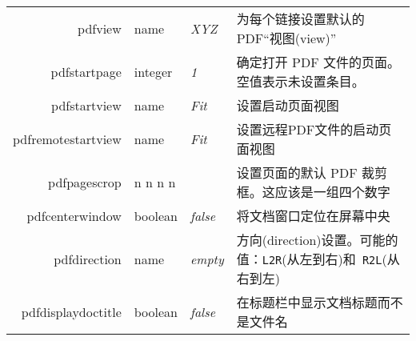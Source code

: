 \documentclass{article}
\begin{document}
\begin{longtable}{@{}>{\ttfamily}r>{\raggedright}p{}>{\itshape}lp{7cm}@{}}
    pdfview             & name           & XYZ                       & 为每个链接设置默认的 PDF“视图(view)”                                                                                                                                                                                                     \\
    pdfstartpage        & integer        & 1                         & 确定打开 PDF 文件的页面。空值表示未设置条目。                                                                                                                                                                                                    \\
    pdfstartview        & name           & Fit                       & 设置启动页面视图                                                                                                                                                                                                                     \\
    pdfremotestartview  & name           & Fit                       & 设置远程PDF文件的启动页面视图                                                                                                                                                                                                             \\
    pdfpagescrop        & n n n n        &                           & 设置页面的默认 PDF 裁剪框。这应该是一组四个数字                                                                                                                                                                                                   \\
    pdfcenterwindow     & boolean        & false                     & 将文档窗口定位在屏幕中央                                                                                                                                                                                                                 \\
    pdfdirection        & name           & empty                     & 方向(direction)设置。可能的值：\verb|L2R|(从左到右)和\verb| R2L|(从右到左)                                                                                                                                                                      \\
    pdfdisplaydoctitle  & boolean        & false                     & 在标题栏中显示文档标题而不是文件名                                                                                                                                                                                                            \\

\end{longtable}
\end{document}
